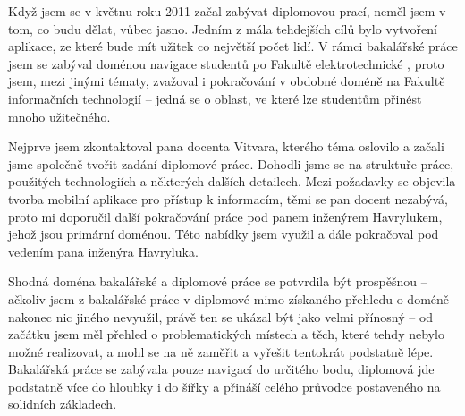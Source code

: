 \begin{introduction}
Když jsem se v květnu roku 2011 začal zabývat diplomovou prací, neměl jsem v tom, co budu dělat, vůbec jasno. Jedním z mála tehdejších cílů bylo vytvoření aplikace, ze které bude mít užitek co největší počet lidí. V rámci bakalářské práce jsem se zabýval doménou navigace studentů po Fakultě elektrotechnické  \cite{Bakalarka}, proto jsem, mezi jinými tématy, zvažoval i pokračování v obdobné doméně na Fakultě informačních technologií -- jedná se o oblast, ve které lze studentům přinést mnoho užitečného.

Nejprve jsem zkontaktoval pana docenta Vitvara, kterého téma oslovilo a začali jsme společně tvořit zadání diplomové práce. Dohodli jsme se na struktuře práce, použitých technologiích a některých dalších detailech. Mezi požadavky se objevila tvorba mobilní aplikace pro přístup k informacím, těmi se pan docent nezabývá, proto mi doporučil další pokračování práce pod panem inženýrem Havrylukem, jehož jsou primární doménou. Této nabídky jsem využil a dále pokračoval pod vedením pana inženýra Havryluka.

Shodná doména bakalářské a diplomové práce se potvrdila být prospěšnou -- ačkoliv jsem z bakalářské práce v diplomové mimo získaného přehledu o doméně nakonec nic jiného nevyužil, právě ten se ukázal být jako velmi přínosný -- od začátku jsem měl přehled o problematických místech a těch, které tehdy nebylo možné realizovat, a mohl se na ně zaměřit a vyřešit tentokrát podstatně lépe. Bakalářská práce se zabývala pouze navigací do určitého bodu, diplomová jde podstatně více do hloubky i do šířky a přináší celého průvodce postaveného na solidních základech.
\end{introduction}
